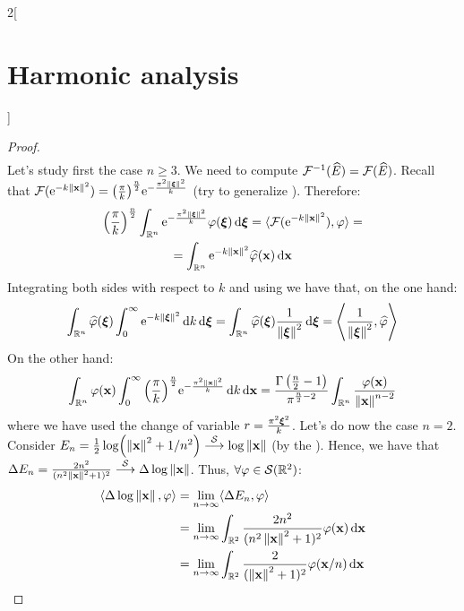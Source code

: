 \documentclass[../../../main_math.tex]{subfiles}
\begin{document}
\begin{multicols}{2}[\section{Harmonic analysis}]
\begin{proof}
\begin{multline*}
    \end{multline*}
    Let's study first the case $n\geq 3$. We need to compute $\mathcal{F}^{-1}(\widehat{E})=\mathcal{F}(\widehat{E})$. Recall that $\mathcal{F}(\mathrm{e}^{-k\left\|\boldsymbol{\mathrm{x}}\right\|^2})= {\left(\frac{\pi}{k}\right)}^{\frac{n}{2}}\mathrm{e}^{-\frac{\pi^2\left\|\boldsymbol{\mathrm{\xi}}\right\|^2}{k}}$ (try to generalize ). Therefore:
    \begin{multline*}
      {\left(\frac{\pi}{k}\right)}^{\frac{n}{2}}\int_{\mathbb{R}^n} \mathrm{e}^{-\frac{\pi^2\left\|\boldsymbol{\mathrm{\xi}}\right\|^2}{k}}\varphi(\boldsymbol{\mathrm{\xi}})\dd{\boldsymbol{\mathrm{\xi}}}=\langle \mathcal{F}(\mathrm{e}^{-k\left\|\boldsymbol{\mathrm{x}}\right\|^2}),\varphi\rangle=\\=\int_{\mathbb{R}^n} \mathrm{e}^{-k\left\|\boldsymbol{\mathrm{x}}\right\|^2}\widehat{\varphi}(\boldsymbol{\mathrm{x}})\dd{\boldsymbol{\mathrm{x}}}
    \end{multline*}
    Integrating both sides with respect to $k$ and using  we have that, on the one hand:
    \begin{equation*}
      \int_{\mathbb{R}^n} \widehat{\varphi}(\boldsymbol{\mathrm{\xi}})\int_0^\infty\mathrm{e}^{-k\left\|\boldsymbol{\mathrm{\xi}}\right\|^2}\dd{k}\dd{\boldsymbol{\mathrm{\xi}}}=\int_{\mathbb{R}^n} \widehat{\varphi}(\boldsymbol{\mathrm{\xi}})\frac{1}{\left\|\boldsymbol{\mathrm{\xi}}\right\|^2}\dd{\boldsymbol{\mathrm{\xi}}}=\left\langle \frac{1}{\left\|\boldsymbol{\mathrm{\xi}}\right\|^2}, \widehat\varphi\right\rangle
    \end{equation*}
    On the other hand:
    $$\int_{\mathbb{R}^n}\varphi(\boldsymbol{\mathrm{x}})\int_{0}^\infty{\left(\frac{\pi}{k}\right)}^{\frac{n}{2}} \mathrm{e}^{-\frac{\pi^2\left\|\boldsymbol{\mathrm{x}}\right\|^2}{k}}\dd{k}\dd{\boldsymbol{\mathrm{x}}}=\frac{\Gamma\left(\frac{n}{2}-1\right)}{\pi^{\frac{n}{2}-2}}\int_{\mathbb{R}^n}\frac{\varphi(\boldsymbol{\mathrm{x}})}{\left\|\boldsymbol{\mathrm{x}}\right\|^{n-2}}$$
    where we have used the change of variable $r=\frac{\pi^2\boldsymbol{\mathrm{\xi}}^2}{k}$. Let's do now the case $n=2$. Consider $E_n=\frac{1}{2}\log(\left\|\boldsymbol{\mathrm{x}}\right\|^2+1/n^2)\overset{\mathcal{S}}{\longrightarrow}\log\left\|\boldsymbol{\mathrm{x}}\right\|$ (by the ). Hence, we have that $\Delta E_n = \frac{2n^2}{(n^2\left\|\boldsymbol{\mathrm{x}}\right\|^2+1)^2}\overset{\mathcal{S}}{\longrightarrow}\Delta\log\left\|\boldsymbol{\mathrm{x}}\right\|$. Thus, $\forall \varphi\in \mathcal{S}(\mathbb{R}^2)$:
    \begin{align*}
      \langle \laplacian\log\norm{\vf{x}},\varphi\rangle & = \lim_{n\to\infty}\langle \laplacian E_n,\varphi\rangle                                        \\
                                                         & = \lim_{n\to\infty}\int_{\RR^2} \frac{2n^2}{(n^2\norm{\vf{x}}^2+1)^2}\varphi(\vf{x})\dd{\vf{x}} \\
                                                         & = \lim_{n\to\infty}\int_{\RR^2} \frac{2}{(\norm{\vf{x}}^2+1)^2}\varphi(\vf{x}/n)\dd{\vf{x}}     \\

\end{align*}
\end{proof}
\end{multicols}
\end{document}
